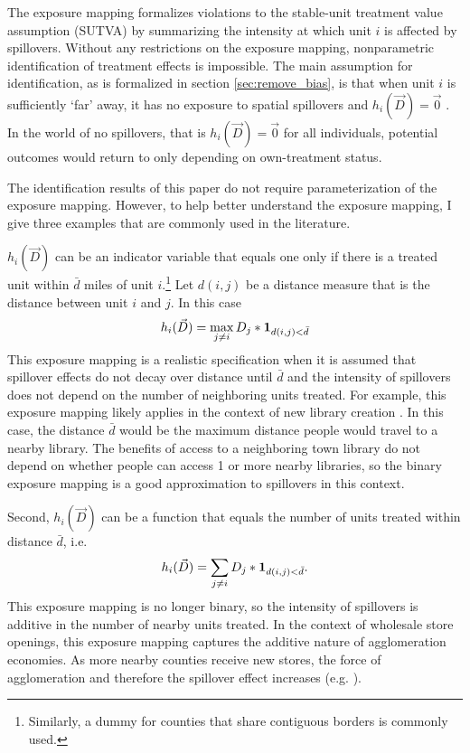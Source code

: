 \documentclass[11pt]{article}
\begin{document}
The exposure mapping formalizes violations to the stable-unit treatment value assumption (SUTVA) by summarizing the intensity at which unit $i$ is affected by spillovers. Without any restrictions on the exposure mapping, nonparametric identification of treatment effects is impossible. The main assumption for identification, as is formalized in section \ref{sec:remove_bias}, is that when unit $i$ is sufficiently `far' away, it has no exposure to spatial spillovers and $h_i(\vec{D}) = \vec{0}$ . In the world of no spillovers, that is $h_i(\vec{D}) = \vec{0}$ for all individuals, potential outcomes would return to only depending on own-treatment status.

The identification results of this paper do not require parameterization of the exposure mapping. However, to help better understand the exposure mapping, I give three examples that are commonly used in the literature. 

\begin{example}
    $h_i(\vec{D})$ can be an indicator variable that equals one only if there is a treated unit within $\bar{d}$ miles of unit $i$.\footnote{Similarly, a dummy for counties that share contiguous borders is commonly used.} Let $d(i,j)$ be a distance measure that is the distance between unit $i$ and $j$.  In this case \begin{equation}\label{eq:h_within}
        h_i(\vec{D}) = \max_{j \neq i} D_j * \mathbf{1}_{ d(i,j) < \bar{d}}
    \end{equation}
    This exposure mapping is a realistic specification when it is assumed that spillover effects do not decay over distance until $\bar{d}$ and the intensity of spillovers does not depend on the number of neighboring units treated. For example, this exposure mapping likely applies in the context of new library creation \citep{Berkes_Nencka_2020}. In this case, the distance $\bar{d}$ would be the maximum distance people would travel to a nearby library. The benefits of access to a neighboring town library do not depend on whether people can access 1 or more nearby libraries, so the binary exposure mapping is a good approximation to spillovers in this context.  
\end{example}
    
\begin{example}
    Second, $h_i(\vec{D})$ can be a function that equals the number of units treated within distance $\bar{d}$, i.e. \begin{equation}\label{eq:h_within_additive}
        h_i(\vec{D}) = \sum_{j \neq i} D_j * \mathbf{1}_{d(i,j) < \bar{d}}.
    \end{equation}
    This exposure mapping is no longer binary, so the intensity of spillovers is additive in the number of nearby units treated. In the context of wholesale store openings, this exposure mapping captures the additive nature of agglomeration economies. As more nearby counties receive new stores, the force of agglomeration and therefore the spillover effect increases (e.g. \citet{Basker_2005}).
\end{example}
    
\end{document}
